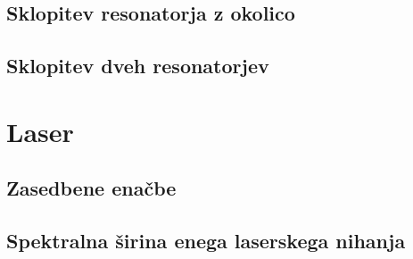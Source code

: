 \documentclass[11pt,fleqn]{book} %
\begin{document}











\section{Sklopitev resonatorja z okolico}
\section{Sklopitev dveh resonatorjev}





%
\chapter{Laser}
\section{Zasedbene enačbe}
\section{Spektralna širina enega laserskega nihanja}
\end{document}
